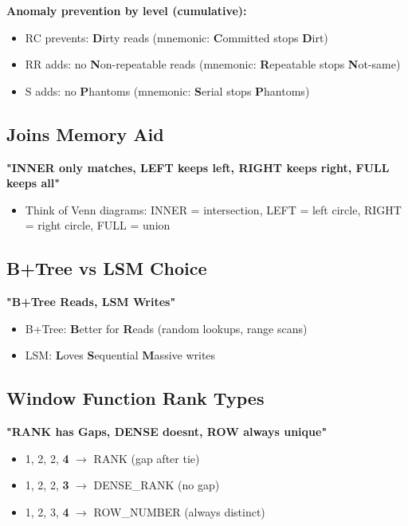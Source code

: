 \documentclass[11pt]{article}
\providecommand{\tightlist}{\setlength{\itemsep}{1pt}\setlength{\parskip}{0pt}}
\begin{document}
\textbf{Anomaly prevention by level (cumulative):}

\begin{itemize}
\tightlist
\item
  RC prevents: \textbf{D}irty reads (mnemonic: \textbf{C}ommitted stops \textbf{D}irt)
\item
  RR adds: no \textbf{N}on-repeatable reads (mnemonic: \textbf{R}epeatable stops \textbf{N}ot-same)
\item
  S adds: no \textbf{P}hantoms (mnemonic: \textbf{S}erial stops \textbf{P}hantoms)
\end{itemize}

\subsection{Joins Memory Aid}\label{joins-memory-aid}

\textbf{"INNER only matches, LEFT keeps left, RIGHT keeps right, FULL keeps all"}

\begin{itemize}
\tightlist
\item
  Think of Venn diagrams: INNER = intersection, LEFT = left circle, RIGHT = right circle, FULL = union
\end{itemize}

\subsection{B+Tree vs LSM Choice}\label{btree-vs-lsm-choice}

\textbf{"B+Tree Reads, LSM Writes"}

\begin{itemize}
\tightlist
\item
  B+Tree: \textbf{B}etter for \textbf{R}eads (random lookups, range scans)
\item
  LSM: \textbf{L}oves \textbf{S}equential \textbf{M}assive writes
\end{itemize}

\subsection{Window Function Rank Types}\label{window-function-rank-types}

\textbf{"RANK has Gaps, DENSE doesn\textquotesingle t, ROW always unique"}

\begin{itemize}
\tightlist
\item
  1, 2, 2, \textbf{4} \(\rightarrow\) RANK (gap after tie)
\item
  1, 2, 2, \textbf{3} \(\rightarrow\) DENSE\_RANK (no gap)
\item
  1, 2, 3, \textbf{4} \(\rightarrow\) ROW\_NUMBER (always distinct)
\end{itemize}
\end{document}
